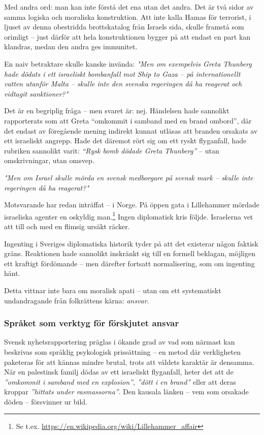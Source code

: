 Med andra ord: man kan inte förstå det ena utan det andra. Det är två sidor av samma logiska och moraliska konstruktion. Att inte kalla Hamas för terrorist, i ljuset av denna obestridda brottskatalog från Israels sida, skulle framstå som orimligt – just därför att hela konstruktionen bygger på att endast en part kan klandras, medan den andra ges immunitet.

En naiv betraktare skulle kanske invända:
\textit{"Men om exempelvis Greta Thunberg hade dödats i ett israeliskt bombanfall mot Ship to Gaza – på internationellt vatten utanför Malta – skulle inte den svenska regeringen då ha reagerat och vidtagit sanktioner?"}

Det är en begriplig fråga – men svaret är: nej. Händelsen hade sannolikt rapporterats som att Greta “omkommit i samband med en brand ombord”, där det endast av föregående mening indirekt kunnat utläsas att branden orsakats av ett israeliskt angrepp. Hade det däremot rört sig om ett ryskt flyganfall, hade rubriken sannolikt varit: \textit{“Rysk bomb dödade Greta Thunberg”} – utan omskrivningar, utan omsvep.

\textit{"Men om Israel skulle mörda en svensk medborgare på svensk mark – skulle inte regeringen då ha reagerat?"}

Motsvarande har redan inträffat – i Norge. På öppen gata i Lillehammer mördade israeliska agenter en oskyldig man.\footnote{Se t.ex. \url{https://en.wikipedia.org/wiki/Lillehammer_affair}} Ingen diplomatisk kris följde. Israelerna vet att till och med en flimsig ursäkt räcker.

Ingenting i Sveriges diplomatiska historik tyder på att det existerar någon faktisk gräns. Reaktionen hade sannolikt inskränkt sig till en formell beklagan, möjligen ett kraftigt fördömande – men därefter fortsatt normalisering, som om ingenting hänt.

Detta vittnar inte bara om moralisk apati – utan om ett systematiskt undandragande från folkrättens kärna: \textit{ansvar}.



\subsubsection*{Språket som verktyg för förskjutet ansvar}

Svensk nyhetsrapportering präglas i ökande grad av vad som närmast kan beskrivas som språklig psykologisk prissättning – en metod där verkligheten paketeras för att kännas mindre brutal, trots att våldets karaktär är densamma.
När en palestinsk familj dödas av ett israeliskt flyganfall, heter det att de \textit{”omkommit i samband med en explosion”}, \textit{”dött i en brand”} eller att deras kroppar \textit{”hittats under rasmassorna”}. Den kausala länken – vem som orsakade döden – försvinner ur bild.

